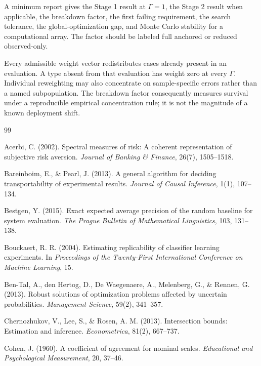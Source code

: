 \documentclass[11pt]{article}
\theoremstyle{remark}
\begin{document}
A minimum report gives the Stage 1 result at $\Gamma=1$, the Stage 2 result
when applicable, the breakdown factor, the first failing requirement, the
search tolerance, the global-optimization gap, and Monte Carlo stability for a
computational array. The factor should be labeled full anchored or reduced
observed-only.

Every admissible weight vector redistributes cases already present in an
evaluation. A type absent from that evaluation has weight zero at every
$\Gamma$. Individual reweighting may also concentrate on sample-specific
errors rather than a named subpopulation. The breakdown factor consequently
measures survival under a reproducible empirical concentration rule; it is not
the magnitude of a known deployment shift.


\begin{thebibliography}{99}
\setlength{\itemsep}{0.25em}

Acerbi, C. (2002).
Spectral measures of risk: A coherent representation of subjective risk aversion.
\emph{Journal of Banking \& Finance}, 26(7), 1505--1518.

Bareinboim, E., \& Pearl, J. (2013).
A general algorithm for deciding transportability of experimental results.
\emph{Journal of Causal Inference}, 1(1), 107--134.

Bestgen, Y. (2015).
Exact expected average precision of the random baseline for system evaluation.
\emph{The Prague Bulletin of Mathematical Linguistics}, 103, 131--138.

Bouckaert, R. R. (2004).
Estimating replicability of classifier learning experiments.
In \emph{Proceedings of the Twenty-First International Conference on Machine Learning}, 15.

Ben-Tal, A., den Hertog, D., De Waegenaere, A., Melenberg, G., \& Rennen, G. (2013).
Robust solutions of optimization problems affected by uncertain probabilities.
\emph{Management Science}, 59(2), 341--357.

Chernozhukov, V., Lee, S., \& Rosen, A. M. (2013).
Intersection bounds: Estimation and inference.
\emph{Econometrica}, 81(2), 667--737.

Cohen, J. (1960).
A coefficient of agreement for nominal scales.
\emph{Educational and Psychological Measurement}, 20, 37--46.


\end{thebibliography}
\end{document}
